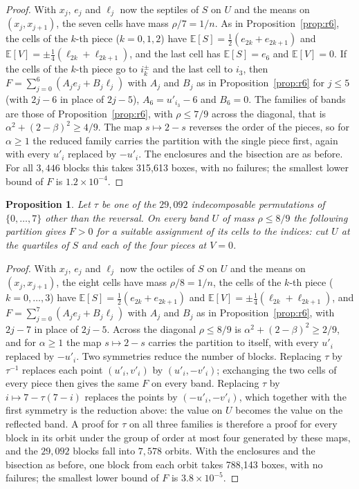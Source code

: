 \documentclass[11pt]{amsart}
\newtheorem{proposition}[theorem]{Proposition}
\theoremstyle{definition}
\theoremstyle{remark}
\numberwithin{equation}{section}
\newcommand{\E}{\mathbb{E}}
\begin{document}
\begin{proof}
With $x_j$, $e_j$ and $\ell_j$ now the septiles of $S$ on $U$ and the means on $(x_j,x_{j+1})$, the seven cells have mass
$\rho/7=1/n$. As in Proposition~\ref{prop:r6}, the cells of the $k$-th piece ($k=0,1,2$) have $\E[S]=\frac12(e_{2k}+e_{2k+1})$
and $\E[V]=\pm\frac14(\ell_{2k}+\ell_{2k+1})$, and the last cell has $\E[S]=e_6$ and $\E[V]=0$. If the cells of the $k$-th
piece go to $i_k^\pm$ and the last cell to $i_3$, then $F=\sum_{j=0}^{6}(A_je_j+B_j\ell_j)$ with $A_j$ and $B_j$ as in
Proposition~\ref{prop:r6} for $j\le5$ (with $2j-6$ in place of $2j-5$), $A_6=u'_{i_3}-6$ and $B_6=0$. The families of bands
are those of Proposition~\ref{prop:r6}, with $\rho\le7/9$ across the diagonal, that is $\alpha^2+(2-\beta)^2\ge4/9$.
The map $s\mapsto2-s$ reverses the order of the pieces, so for $\alpha\ge1$ the reduced family carries the partition with
the single piece first, again with every $u'_i$ replaced by $-u'_i$. The enclosures and the bisection are as before. For
all $3{,}446$ blocks this takes 315{,}613 boxes, with no failures; the smallest lower bound of $F$ is $1.2\times10^{-4}$.
\end{proof}

\begin{proposition}\label{prop:r8}
Let $\tau$ be one of the $29{,}092$ indecomposable permutations of $\{0,\dots,7\}$ other than the reversal. On every band
$U$ of mass $\rho\le8/9$ the following partition gives $F>0$ for a suitable assignment of its cells to the indices: cut
$U$ at the quartiles of $S$ and each of the four pieces at $V=0$.
\end{proposition}

\begin{proof}
With $x_j$, $e_j$ and $\ell_j$ now the octiles of $S$ on $U$ and the means on $(x_j,x_{j+1})$, the eight cells have mass
$\rho/8=1/n$, the cells of the $k$-th piece ($k=0,\dots,3$) have $\E[S]=\frac12(e_{2k}+e_{2k+1})$ and
$\E[V]=\pm\frac14(\ell_{2k}+\ell_{2k+1})$, and $F=\sum_{j=0}^{7}(A_je_j+B_j\ell_j)$ with $A_j$ and $B_j$ as in
Proposition~\ref{prop:r6}, with $2j-7$ in place of $2j-5$. Across the diagonal $\rho\le8/9$ is
$\alpha^2+(2-\beta)^2\ge2/9$, and for $\alpha\ge1$ the map $s\mapsto2-s$ carries the partition to itself, with every
$u'_i$ replaced by $-u'_i$. Two symmetries reduce the number of blocks. Replacing $\tau$ by $\tau^{-1}$ replaces each point
$(u'_i,v'_i)$ by $(u'_i,-v'_i)$; exchanging the two cells of every piece then gives the same $F$ on every band. Replacing
$\tau$ by $i\mapsto7-\tau(7-i)$ replaces the points by $(-u'_i,-v'_i)$, which together with the first symmetry is the
reduction above: the value on $U$ becomes the value on the reflected band. A proof for $\tau$ on all three families is
therefore a proof for every block in its orbit under the group of order at most four generated by these maps, and the
$29{,}092$ blocks fall into $7{,}578$ orbits. With the enclosures and the bisection as before, one block from each orbit
takes 788{,}143 boxes, with no failures; the smallest lower bound of $F$ is $3.8\times10^{-5}$.
\end{proof}
\end{document}
